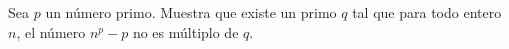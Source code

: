 Sea $p$ un número primo. Muestra que existe un primo $q$ tal que para todo entero $n$, el número $n^p-p$ no es múltiplo de $q$.